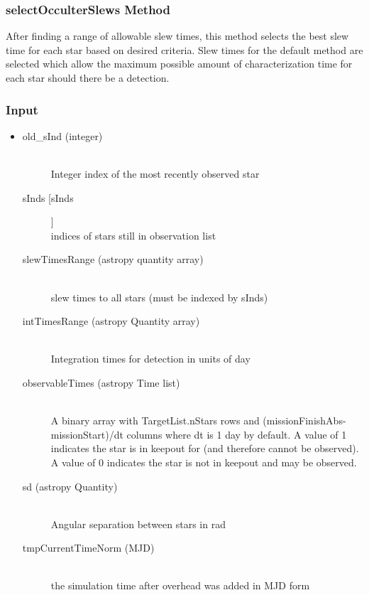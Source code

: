 \documentclass[cleanfoot]{asme2ej}
\begin{document}
\subsubsection{selectOcculterSlews Method} \label{sec:findAllowableOcculterSlewstask}
After finding a range of allowable slew times, this method selects the best slew time for each star based on desired criteria. Slew times for the default method are selected which allow the maximum possible amount of characterization time for each star should there be a detection. 

\subsubsection*{Input}
\begin{itemize}
\item
\begin{description}
    \item[old\_sInd (integer)] \hfill \\ Integer index of the most recently observed star
    \item[sInds [sInds]] \hfill \\ indices of stars still in observation list
    \item[slewTimesRange (astropy quantity array)] \hfill \\ slew times to all stars (must be indexed by sInds)
    \item[intTimesRange (astropy Quantity array)] \hfill \\ Integration times for detection in units of day
    \item[observableTimes (astropy Time list)] \hfill \\ A binary array with TargetList.nStars rows and (missionFinishAbs-missionStart)/dt columns where dt is 1 day by default. A value of 1 indicates the star is in keepout for (and therefore cannot be observed). A value of 0 indicates the star is not in keepout and may be observed.
    \item[sd (astropy Quantity)] \hfill \\ Angular separation between stars in rad
    \item[tmpCurrentTimeNorm (MJD)] \hfill \\ the simulation time after overhead was added in MJD form
\end{description}
\end{itemize}
\end{document}

